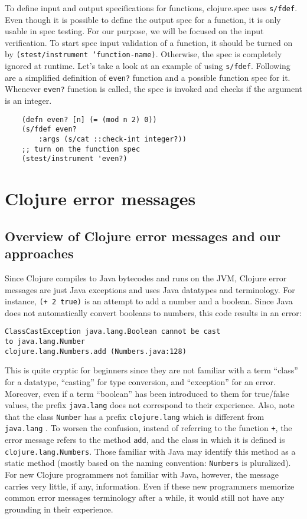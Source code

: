 \documentclass[12pt]{article}
\newcommand{\comment}[1]{{\bf \tt  {#1}}}
\newcommand{\emcomment}[1]{\textcolor{ForestGreen}{\comment{Elena: {#1}}}}
\newcommand{\tscomment}[1]{\textcolor{Teal}{\comment{Tony: {#1}}}}
\begin{document}
	To define input and output specifications for functions, clojure.spec uses \texttt{s/fdef}. Even though it is possible to 
	define the output spec for a function, it is only usable in spec testing. For our purpose, we will be focused on the input 
	verification. To start spec input validation of a function, it should be turned on by \texttt{(stest/instrument `function-name)}. 
	Otherwise, the spec is completely ignored at runtime. Let's take a look at an example of using \texttt{s/fdef}. Following 
	are a simplified definition of \texttt{even?} function and a possible function spec for it. Whenever \texttt{even?} function
	is called, the spec is invoked and checks if the argument is an integer.
	
	\begin{verbatim}
	(defn even? [n] (= (mod n 2) 0))
	(s/fdef even?
    	:args (s/cat ::check-int integer?))
	;; turn on the function spec
	(stest/instrument 'even?)
	\end{verbatim}
	
	


\section{Clojure error messages}
\subsection{Overview of Clojure error messages and our approaches}
Since Clojure compiles to Java bytecodes and runs on the JVM, Clojure error messages are just Java exceptions
and uses Java datatypes and terminology. 
For instance, {\tt (+ 2 true)} is an attempt to add a number and a boolean. 
Since Java does not automatically convert booleans to numbers, this code results in an error:
\begin{verbatim}
ClassCastException java.lang.Boolean cannot be cast 
to java.lang.Number  
clojure.lang.Numbers.add (Numbers.java:128)
\end{verbatim} 
This is quite cryptic for beginners since they are not familiar with a term ``class'' for a datatype,
``casting'' for type conversion, and ``exception'' for an error. Moreover, even if a term ``boolean'' 
has been introduced to them for true/false values, the prefix {\tt  java.lang} does not 
correspond to their experience. Also, note that the class {\tt Number} has a prefix {\tt  clojure.lang}
which is different from {\tt  java.lang} . To worsen the confusion, instead of referring
to the function {\tt +}, the error message refers to the method {\tt add}, and the class 
in which it is defined is {\tt clojure.lang.Numbers}. Those familiar with Java may identify this
method as a static method (mostly based on the naming convention: {\tt Numbers} is pluralized). 
For new Clojure programmers not familiar with Java, however, the message carries very little, if any, information. 
Even if these new programmers memorize common error messages terminology after a while, 
it would still not have any grounding in their experience. 
\end{document}
